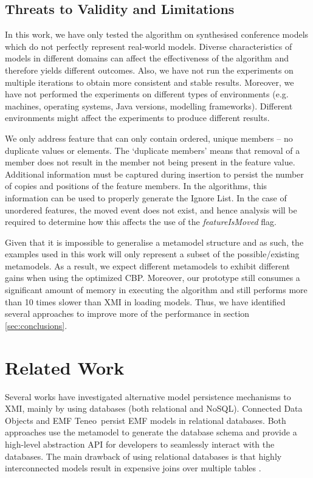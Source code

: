 \documentclass{llncs}
\begin{document}
\subsection{Threats to Validity and Limitations}
\label{sec:limitations_and_future_work}
In this work, we have only tested the algorithm on synthesised conference models which do not perfectly represent real-world models. Diverse characteristics of models in different domains can affect the effectiveness of the algorithm and therefore yields different outcomes. Also, we have not run the experiments on multiple iterations to obtain more consistent and stable results. Moreover, we have not performed the experiments on different types of environments (e.g. machines, operating systems, Java versions, modelling frameworks). Different environments might affect the experiments to produce different results. 

We only address feature that can only contain ordered, unique members -- no duplicate values or elements.
The `duplicate members' means that removal of a member does not result in the member not being present in the feature value.
Additional information must be captured during insertion to persist the number of copies and positions of the feature members.
In the algorithms, this information can be used to properly generate the Ignore List.
In the case of unordered features, the moved event does not exist, and hence analysis will be required to determine how this affects the use of the \emph{featureIsMoved} flag. 

Given that it is impossible to generalise a metamodel structure and as such, the examples used in this work will only represent a subset of the possible/existing metamodels. As a result, we expect different metamodels to exhibit different gains when using the optimized CBP. Moreover, our prototype still consumes a significant amount of memory in executing the algorithm and still performs more than 10 times slower than XMI in loading models. Thus, we have identified several approaches to improve more of the performance in section \ref{sec:conclusions}.

\section{Related Work}
\label{sec:related_work}
Several works have investigated alternative model persistence mechanisms to XMI, mainly by using databases (both relational and NoSQL). Connected Data Objects \cite{eclipse2017cdo} and EMF Teneo\,\cite{eclipse2017teneo} persist EMF models in relational databases.
Both approaches use the metamodel to generate the database schema and provide a high-level abstraction API for developers to seamlessly interact with the databases. The main drawback of using relational databases is that highly interconnected models result in expensive joins over multiple tables \cite{barmpis2014evaluation}. 
\end{document}
